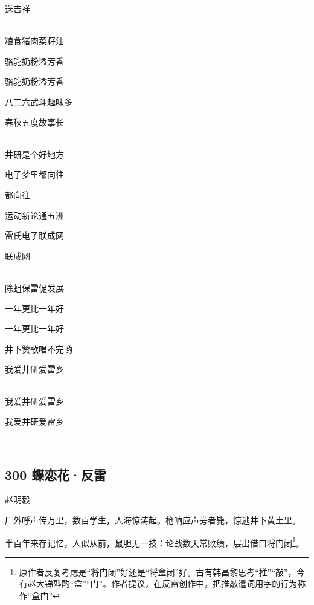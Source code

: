 送吉祥

~\\
粮食猪肉菜籽油

骆驼奶粉溢芳香

骆驼奶粉溢芳香

八二六武斗趣味多

春秋五度故事长

~\\
井研是个好地方

电子梦里都向往

都向往

运动新论通五洲

雷氏电子联成网

联成网

~\\
除蛆保雷促发展

一年更比一年好

一年更比一年好

井下赞歌唱不完哟

我爱井研爱雷乡

~\\
我爱井研爱雷乡

我爱井研爱雷乡

~\\

\hypertarget{ux8776ux604bux82b1ux53cdux96f7}{%
\subsection{300 蝶恋花·反雷}\label{ux8776ux604bux82b1ux53cdux96f7}}

{赵明毅}

厂外呼声传万里，数百学生，人海惊涛起。枪响应声旁者毙，惊逃井下黄土里。

半百年来存记忆，人似从前，鼠胆无一技：论战数天常败绩，层出借口将门闭\footnote{原作者反复考虑是``将门闭''好还是``将盒闭''好。古有韩昌黎思考``推''``敲''，今有赵大锑斟酌``盒''``门''。作者提议，在反雷创作中，把推敲遣词用字的行为称作``盒门''}。
